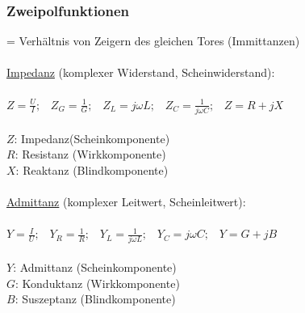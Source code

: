 \documentclass[a4paper,twocolumn,10pt]{article}
\begin{document}
\subsubsection*{Zweipolfunktionen}
= Verhältnis von Zeigern des gleichen Tores (Immittanzen)\\\\
\underline{Impedanz} (komplexer Widerstand, Scheinwiderstand):\\\\
$Z=\frac{U}{I};\;\;\;Z_G=\frac{1}{G};\;\;\;Z_L=j\omega L;\;\;\;Z_C=\frac{1}{j\omega C};\;\;\;Z=R+jX$\\\\
$Z$: Impedanz(Scheinkomponente)\\
$R$: Resistanz (Wirkkomponente)\\
$X$: Reaktanz (Blindkomponente)\\\\
\underline{Admittanz} (komplexer Leitwert, Scheinleitwert):\\\\
$Y=\frac{I}{U};\;\;\;Y_R=\frac{1}{R};\;\;\;Y_L=\frac{1}{j\omega L};\;\;\;Y_C=j\omega C;\;\;\;Y=G+jB$\\\\
$Y$: Admittanz (Scheinkomponente)\\
$G$: Konduktanz (Wirkkomponente)\\
$B$: Suszeptanz (Blindkomponente)
\end{document}

